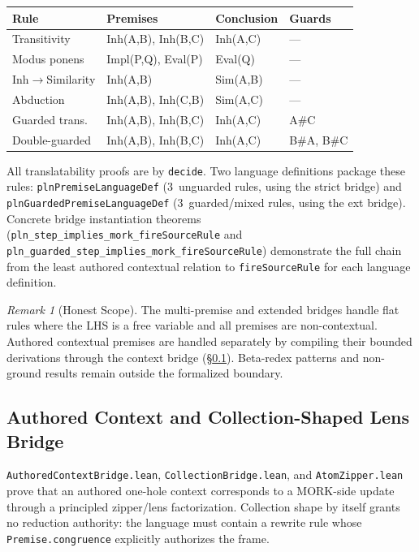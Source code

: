 \documentclass[11pt]{article}
\theoremstyle{definition}
\theoremstyle{remark}
\newtheorem{remark}[theorem]{Remark}
\newcommand{\MORK}{\textup{MORK}}
\begin{document}
\begin{center}
\begin{tabular}{@{}llll@{}}
\toprule
\textbf{Rule} & \textbf{Premises} & \textbf{Conclusion} & \textbf{Guards} \\
\midrule
Transitivity       & Inh(A,B), Inh(B,C)             & Inh(A,C)  & --- \\
Modus ponens       & Impl(P,Q), Eval(P)              & Eval(Q)   & --- \\
Inh$\to$Similarity & Inh(A,B)                        & Sim(A,B)  & --- \\
Abduction          & Inh(A,B), Inh(C,B)              & Sim(A,C)  & --- \\
Guarded trans.     & Inh(A,B), Inh(B,C)              & Inh(A,C)  & A\#C \\
Double-guarded     & Inh(A,B), Inh(B,C)              & Inh(A,C)  & B\#A, B\#C \\
\bottomrule
\end{tabular}
\end{center}

\noindent
All translatability proofs are by \texttt{decide}.
Two language definitions package these rules:
\texttt{plnPremiseLanguageDef} (3~unguarded rules, using the strict bridge)
and \texttt{plnGuardedPremiseLanguageDef} (3~guarded/mixed rules, using the
ext bridge).  Concrete bridge instantiation theorems
(\texttt{pln\_step\_implies\_mork\_fireSourceRule} and
\texttt{pln\_guarded\_step\_implies\_mork\_fireSourceRule})
demonstrate the full chain from the least authored contextual relation to
\texttt{fireSourceRule} for each language definition.

\begin{remark}[Honest Scope]
The multi-premise and extended bridges handle flat rules where the LHS is
a free variable and all premises are non-contextual.  Authored contextual
premises are handled separately by compiling their bounded derivations through
the context bridge (\S\ref{sec:collbridge}).
Beta-redex patterns and non-ground results remain outside the formalized
boundary.
\end{remark}

\subsection{Authored Context and Collection-Shaped Lens Bridge}
\label{sec:collbridge}

\texttt{AuthoredContextBridge.lean}, \texttt{CollectionBridge.lean}, and
\texttt{AtomZipper.lean} prove that an authored one-hole context corresponds to
a \MORK{}-side update through a principled zipper/lens factorization.
Collection shape by itself grants no reduction authority: the language must
contain a rewrite rule whose \texttt{Premise.congruence} explicitly authorizes
the frame.
\end{document}
